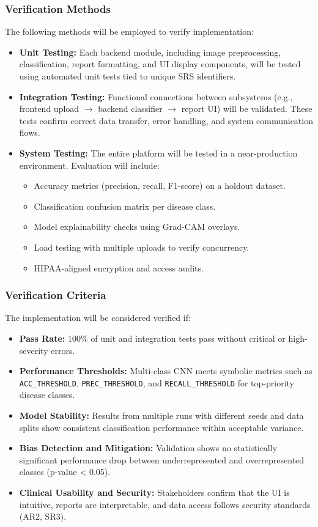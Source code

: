 \documentclass[12pt, titlepage]{article}
\begin{document}
\subsubsection{Verification Methods}
The following methods will be employed to verify implementation:
\begin{itemize}
  \item \textbf{Unit Testing:} Each backend module, including image preprocessing, classification, report formatting, and UI display components, will be tested using automated unit tests tied to unique SRS identifiers.
  \item \textbf{Integration Testing:} Functional connections between subsystems (e.g., frontend upload $\rightarrow$ backend classifier $\rightarrow$ report UI) will be validated. These tests confirm correct data transfer, error handling, and system communication flows.
  \item \textbf{System Testing:} The entire platform will be tested in a near-production environment. Evaluation will include:
    \begin{itemize}
      \item Accuracy metrics (precision, recall, F1-score) on a holdout dataset.
      \item Classification confusion matrix per disease class.
      \item Model explainability checks using Grad-CAM overlays.
      \item Load testing with multiple uploads to verify concurrency.
      \item HIPAA-aligned encryption and access audits.
    \end{itemize}
\end{itemize}

\subsubsection{Verification Criteria}
The implementation will be considered verified if:
\begin{itemize}
  \item \textbf{Pass Rate:} 100\% of unit and integration tests pass without critical or high-severity errors.
  \item \textbf{Performance Thresholds:} Multi-class CNN meets symbolic metrics such as \texttt{ACC\_THRESHOLD}, \texttt{PREC\_THRESHOLD}, and \texttt{RECALL\_THRESHOLD} for top-priority disease classes.
  \item \textbf{Model Stability:} Results from multiple runs with different seeds and data splits show consistent classification performance within acceptable variance.
  \item \textbf{Bias Detection and Mitigation:} Validation shows no statistically significant performance drop between underrepresented and overrepresented classes (p-value < 0.05).
  \item \textbf{Clinical Usability and Security:} Stakeholders confirm that the UI is intuitive, reports are interpretable, and data access follows security standards (AR2, SR3).
\end{itemize}
\end{document}
